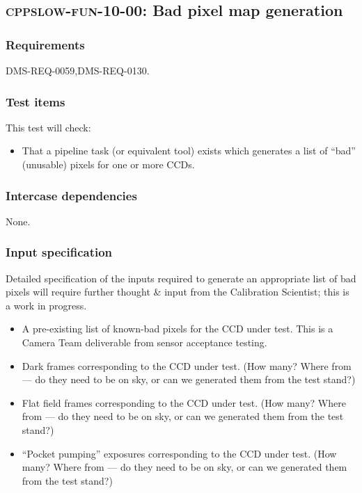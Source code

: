 \subsection{\textsc{cppslow-fun-10-00}: Bad pixel map generation}
\label{cppslow-fun-10-00}

\subsubsection{Requirements}

DMS-REQ-0059,DMS-REQ-0130.

\subsubsection{Test items}

This test will check:

\begin{itemize}

  \item{That a pipeline task (or equivalent tool) exists which generates a list
  of ``bad'' (unusable) pixels for one or more CCDs.}

\end{itemize}

\subsubsection{Intercase dependencies}

None.

\subsubsection{Input specification}

\begin{note}
Detailed specification of the inputs required to generate an appropriate list of
bad pixels will require further thought \& input from the Calibration Scientist;
this is a work in progress.
\end{note}

\begin{itemize}

  \item{A pre-existing list of known-bad pixels for the CCD under test. This is a Camera Team
  deliverable from sensor acceptance testing.}

  \item{Dark frames corresponding to the CCD under test. (How many? Where from —
  do they need to be on sky, or can we generated them from the test stand?)}

  \item{Flat field frames corresponding to the CCD under test. (How many? Where from —
  do they need to be on sky, or can we generated them from the test stand?)}

  \item{``Pocket pumping'' exposures corresponding to the CCD under test.  (How
  many? Where from — do they need to be on sky, or can we generated them from
  the test stand?)}

\end{itemize}

